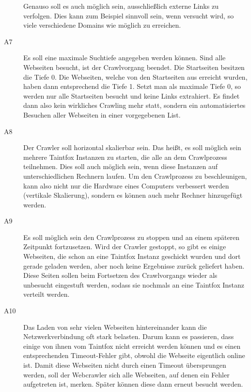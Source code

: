 \begin{description}
	Genauso soll es auch möglich sein, ausschließlich externe Links zu verfolgen. Dies kann zum Beispiel sinnvoll sein, wenn versucht wird, so viele verschiedene Domains wie möglich zu erreichen.
	\item[ A7 ] Es soll eine maximale Suchtiefe angegeben werden können. Sind alle Webseiten besucht, ist der Crawlvorgang beendet. Die Startseiten besitzen die Tiefe 0. Die Webseiten, welche von den Startseiten aus erreicht wurden, haben dann entsprechend die Tiefe 1. Setzt man als maximale Tiefe 0, so werden nur alle Startseiten besucht und keine Links extrahiert. Es findet dann also kein wirkliches Crawling mehr statt, sondern ein automatisiertes Besuchen aller Webseiten in einer vorgegebenen List.
	\item[ A8 ] Der Crawler soll horizontal skalierbar sein. Das heißt, es soll möglich sein mehrere Taintfox Instanzen zu starten, die alle an dem Crawlprozess teilnehmen. Dies soll auch möglich sein, wenn diese Instanzen auf unterschiedlichen Rechnern laufen. Um den Crawlprozess zu beschleunigen, kann also nicht nur die Hardware eines Computers verbessert werden (vertikale Skalierung), sondern es können auch mehr Rechner hinzugefügt werden.
	\item[ A9 ] Es soll möglich sein den Crawlprozess zu stoppen und an einem späteren Zeitpunkt fortzusetzen. Wird der Crawler gestoppt, so gibt es einige Webseiten, die schon an eine Taintfox Instanz geschickt wurden und dort gerade geladen werden, aber noch keine Ergebnisse zurück geliefert haben. Diese Seiten sollen beim Fortsetzen des Crawlvorgangs wieder als unbesucht eingestuft werden, sodass sie nochmals an eine Taintfox Instanz verteilt werden.
	\item[A10] Das Laden von sehr vielen Webseiten hintereinander kann die Netzwerkverbindung oft stark belasten. Darum kann es passieren, dass einige von ihnen vom Taintfox nicht erreicht werden können und es einen entsprechenden Timeout-Fehler gibt, obwohl die Webseite eigentlich online ist. Damit diese Webseiten nicht durch einen Timeout übersprungen werden, soll der Webcrawler sich alle Webseiten, auf denen ein Fehler aufgetreten ist, merken. Später können diese dann erneut besucht werden.  
\end{description}


